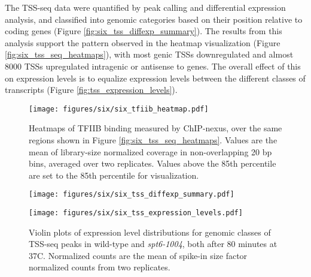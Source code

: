 The TSS-seq data were quantified by peak calling and differential expression analysis, and classified into genomic categories based on their position relative to coding genes (Figure \ref{fig:six_tss_diffexp_summary}).
The results from this analysis support the pattern observed in the heatmap visualization (Figure \ref{fig:six_tss_seq_heatmaps}), with most genic TSSs downregulated and almost 8000 TSSs upregulated intragenic or antisense to genes.
The overall effect of this on expression levels is to equalize expression levels between the different classes of transcripts (Figure \ref{fig:tss_expression_levels}).

\begin{wrapfigure}[19]{R}{3in}
\centering
\texttt{[image: figures/six/six\_tfiib\_heatmap.pdf]}
\caption[Heatmaps of TFIIB ChIP-nexus protection over non-overlapping coding genes, from wild-type and \textit{spt6-1004} cells, both after 80 minutes at 37\textdegree C]{Heatmaps of TFIIB binding measured by ChIP-nexus, over the same regions shown in Figure \ref{fig:six_tss_seq_heatmaps}. Values are the mean of library-size normalized coverage in non-overlapping 20 bp bins, averaged over two replicates. Values above the 85th percentile are set to the 85th percentile for visualization.}
\label{fig:six_tfiib_heatmap}
\end{wrapfigure}

\lipsum

\begin{figure}[H]
    \centering
    \begin{minipage}[t]{2.875in}
        \centering
        \texttt{[image: figures/six/six\_tss\_diffexp\_summary.pdf]}
        \caption[Bar plots of the number of TSS-seq peaks in different genomic classes differentially expressed in \textit{spt6-1004} versus wild-type.]{Bar plots of the number of TSS-seq peaks differentially expressed in \textit{spt6-1004} after 80 minutes at 37\textdegree C versus wild-type after 80 minutes at 37\textdegree C. The height of each bar is proportional to the total number of peaks in the category, including those not found to be significantly differentially expressed.}
        \label{fig:six_tss_diffexp_summary}
    \end{minipage}\hfill
    \begin{minipage}[t]{2.875in}
        \centering
        \texttt{[image: figures/six/six\_tss\_expression\_levels.pdf]}
        \caption[Violin plots of expression level distributions for genomic classes of TSS-seq peaks in wild-type and  cells, both after 80 minutes at 37\textdegree C.]{Violin plots of expression level distributions for genomic classes of TSS-seq peaks in wild-type and \textit{spt6-1004}, both after 80 minutes at 37\textdegree C. Normalized counts are the mean of spike-in size factor normalized counts from two replicates.}
        \label{fig:six_tss_expression_levels}
    \end{minipage}
\end{figure}

\lipsum[1]

\newpage

\begingroup
\singlespacing

\endgroup
